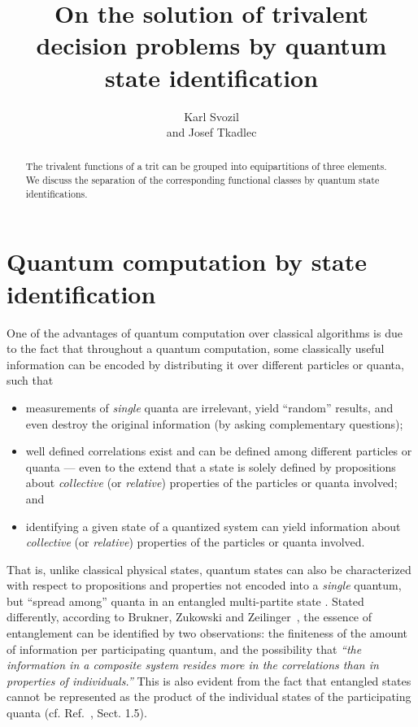 \documentclass[fleqn,twoside]{article}
\title{On the solution of trivalent decision problems by quantum state identification}
\author{Karl Svozil\address{Institut f\"ur Theoretische Physik, University of Technology Vienna, Wiedner Hauptstra\ss e 8-10/136, A-1040 Vienna, Austria}
        and
        Josef Tkadlec\address{Department of Mathematics, Faculty of Electrical Engineering, Czech Technical University, 166\,27 Praha, Czech Republic}
       }
\begin{document}
\begin{abstract}
The trivalent functions of a trit can be grouped into equipartitions of three elements. We discuss the separation of the corresponding functional classes by quantum state identifications.
\end{abstract}





\maketitle

\section{Quantum computation by state identification}

One of the advantages of quantum computation \cite{Gruska,nielsen-book,mermin-07,benn:97,Ozhigov:1997,bbcmw-01,cleve-99,fortnov-03}
over classical algorithms \cite{rogers1,odi:89} is due to
the fact that throughout a quantum computation, some classically useful information
can be encoded by distributing it over different particles or quanta,
such that \cite{mermin-02,svozil-2005-ko}
\begin{itemize}
\item
measurements of {\em single} quanta are irrelevant, yield ``random'' results,
and even destroy the original information (by asking complementary questions);
\item
well defined correlations exist and can be defined among different particles or quanta ---
even to the extend that a state is solely defined by propositions
about {\em collective} (or {\em relative})  properties of the particles or quanta involved;
and
\item
identifying a given state of a quantized system can yield information about
{\em collective} (or {\em relative})  properties of the particles or quanta involved.
\end{itemize}
That is, unlike classical physical states, quantum states can also be characterized with respect to
propositions and properties not encoded into a {\em single} quantum, but ``spread among''
quanta in an entangled multi-partite state
\cite{zeil-99,zeil-bruk-99,zeil-bruk-99a,zeil-bruk-02,DonSvo01,svozil-2002-statepart-prl,svozil-2003-garda}.
Stated differently, according to Brukner, Zukowski and Zeilinger~\cite{zeil-Zuk-bruk-01},
the essence of entanglement can be identified by two observations: the finiteness of the amount of information per participating quantum,
and the possibility that {\em ``the information in a composite system resides more
in the correlations than in properties of individuals.''}
This is also evident from the fact that entangled states cannot be represented as the product of the individual states of the participating quanta
(cf. Ref.~\cite{mermin-07}, Sect. 1.5).
\end{document}
